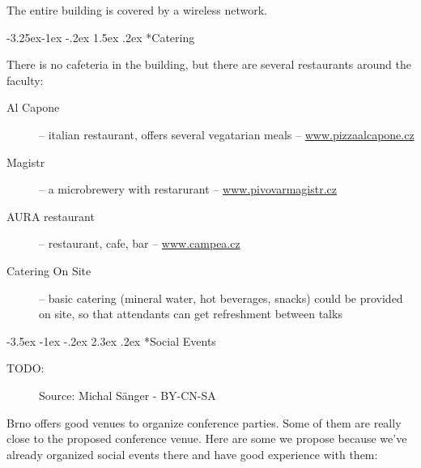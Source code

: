 \documentclass[10pt,a4paper]{article}
\makeatletter
\renewcommand\section{%
\@startsection{section}{1}{\z@}%
              {-3.5ex \@plus -1ex \@minus -.2ex}%
              {2.3ex \@plus.2ex}%
              {\color{kdelight}\sffamily\LARGE\bfseries}}
\renewcommand\subsection{%
\@startsection{subsection}{2}{\z@}%
              {-3.25ex\@plus -1ex \@minus -.2ex}%
              {1.5ex \@plus .2ex}%
              {\color{kdelight}\sffamily\Large\bfseries}}
\makeatother
\begin{document}
The entire building is covered by a wireless network.

\begin{figure}[ht]
\centering
\end{figure}



\subsection*{Catering}
There is no cafeteria in the building, but there are several restaurants around the faculty:

\begin{description}
\item[\color{kdedarker} Al Capone] -- italian restaurant, offers several vegatarian meals -- \sloppy \mbox{\url{www.pizzaalcapone.cz}}
\item[\color{kdedarker} Magistr] -- a microbrewery with restarurant -- \url{www.pivovarmagistr.cz}
\item[\color{kdedarker} AURA restaurant] -- restaurant, cafe, bar -- \url{www.campea.cz}
\item[\color{kdedarker} Catering On Site] -- basic catering (mineral water, hot
beverages, snacks) could be provided on site, so that attendants can get refreshment
between talks
\end{description}


\newpage

\section*{Social Events}
TODO: 

\begin{figure}
\vspace{-22pt}
\begin{center}
\footnotesize{Source: Michal Sänger - BY-CN-SA}
\vspace{-20pt}
\end{center}
\end{figure}

Brno offers good venues to organize conference parties. Some of them are
really close to the proposed conference venue. Here are some we propose
because we've already organized social events there and have good
experience with them:
\end{document}
